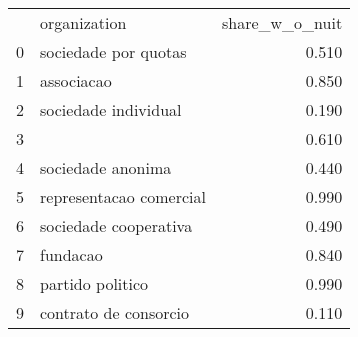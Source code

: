 \begin{tabular}{llr}
 & organization & share_w_o_nuit \\
0 & sociedade por quotas & 0.510 \\
1 & associacao & 0.850 \\
2 & sociedade individual & 0.190 \\
3 &  & 0.610 \\
4 & sociedade anonima & 0.440 \\
5 & representacao comercial & 0.990 \\
6 & sociedade cooperativa & 0.490 \\
7 & fundacao & 0.840 \\
8 & partido politico & 0.990 \\
9 & contrato de consorcio & 0.110 \\
\end{tabular}
